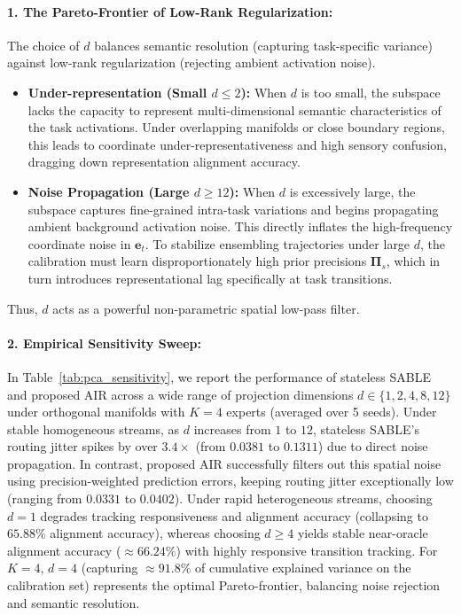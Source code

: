 \documentclass{article}
\theoremstyle{plain}
\theoremstyle{definition}
\theoremstyle{remark}
\begin{document}
\paragraph{1. The Pareto-Frontier of Low-Rank Regularization:}
The choice of $d$ balances semantic resolution (capturing task-specific variance) against low-rank regularization (rejecting ambient activation noise).
\begin{itemize}
    \item \textbf{Under-representation (Small $d \le 2$):} When $d$ is too small, the subspace lacks the capacity to represent multi-dimensional semantic characteristics of the task activations. Under overlapping manifolds or close boundary regions, this leads to coordinate under-representativeness and high sensory confusion, dragging down representation alignment accuracy.
    \item \textbf{Noise Propagation (Large $d \ge 12$):} When $d$ is excessively large, the subspace captures fine-grained intra-task variations and begins propagating ambient background activation noise. This directly inflates the high-frequency coordinate noise in $\mathbf{e}_t$. To stabilize ensembling trajectories under large $d$, the calibration must learn disproportionately high prior precisions $\mathbf{\Pi}_s$, which in turn introduces representational lag specifically at task transitions.
\end{itemize}
Thus, $d$ acts as a powerful non-parametric spatial low-pass filter. 

\paragraph{2. Empirical Sensitivity Sweep:}
In Table~\ref{tab:pca_sensitivity}, we report the performance of stateless SABLE and proposed AIR across a wide range of projection dimensions $d \in \{1, 2, 4, 8, 12\}$ under orthogonal manifolds with $K=4$ experts (averaged over 5 seeds).
Under stable homogeneous streams, as $d$ increases from $1$ to $12$, stateless SABLE's routing jitter spikes by over $3.4\times$ (from $0.0381$ to $0.1311$) due to direct noise propagation. In contrast, proposed AIR successfully filters out this spatial noise using precision-weighted prediction errors, keeping routing jitter exceptionally low (ranging from $0.0331$ to $0.0402$). 
Under rapid heterogeneous streams, choosing $d=1$ degrades tracking responsiveness and alignment accuracy (collapsing to $65.88\%$ alignment accuracy), whereas choosing $d \ge 4$ yields stable near-oracle alignment accuracy ($\approx 66.24\%$) with highly responsive transition tracking. For $K=4$, $d=4$ (capturing $\approx 91.8\%$ of cumulative explained variance on the calibration set) represents the optimal Pareto-frontier, balancing noise rejection and semantic resolution.
\end{document}
